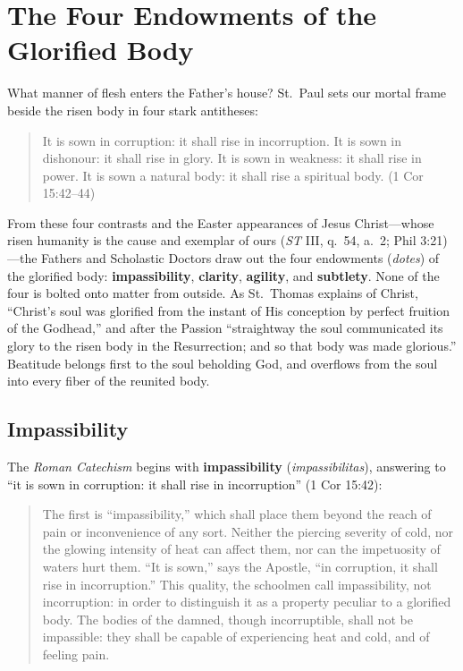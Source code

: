 \section{The Four Endowments of the Glorified Body}

What manner of flesh enters the Father's house? St.\ Paul sets our mortal frame beside the risen body in four stark antitheses:

\begin{quote}
It is sown in corruption: it shall rise in incorruption. It is sown in dishonour: it shall rise in glory. It is sown in weakness: it shall rise in power. It is sown a natural body: it shall rise a spiritual body. (1 Cor 15:42--44)
\end{quote}

From these four contrasts and the Easter appearances of Jesus Christ---whose risen humanity is the cause and exemplar of ours (\textit{ST} III, q.\ 54, a.\ 2; Phil 3:21)---the Fathers and Scholastic Doctors draw out the four endowments (\textit{dotes}) of the glorified body: \textbf{impassibility}, \textbf{clarity}, \textbf{agility}, and \textbf{subtlety}. None of the four is bolted onto matter from outside. As St.\ Thomas explains of Christ, ``Christ's soul was glorified from the instant of His conception by perfect fruition of the Godhead,'' and after the Passion ``straightway the soul communicated its glory to the risen body in the Resurrection; and so that body was made glorious.'' Beatitude belongs first to the soul beholding God, and overflows from the soul into every fiber of the reunited body.

\subsection*{Impassibility}

The \textit{Roman Catechism} begins with \textbf{impassibility} (\textit{impassibilitas}), answering to ``it is sown in corruption: it shall rise in incorruption'' (1 Cor 15:42):

\begin{quote}
The first is ``impassibility,'' which shall place them beyond the reach of pain or inconvenience of any sort. Neither the piercing severity of cold, nor the glowing intensity of heat can affect them, nor can the impetuosity of waters hurt them. ``It is sown,'' says the Apostle, ``in corruption, it shall rise in incorruption.'' This quality, the schoolmen call impassibility, not incorruption: in order to distinguish it as a property peculiar to a glorified body. The bodies of the damned, though incorruptible, shall not be impassible: they shall be capable of experiencing heat and cold, and of feeling pain.
\end{quote}

